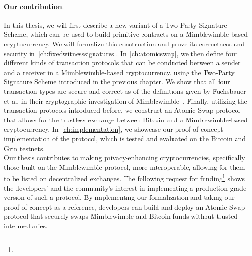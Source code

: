 \paragraph{Our contribution.} In this thesis, we will first describe a new variant of a Two-Party Signature Scheme, which can be used to build primitive contracts on a Mimblewimble-based cryptocurrency.
We will formalize this construction and prove its correctness and security in~\cref{ch:fixedwitnesssignatures}.
In~\cref{ch:atomicswap}, we then define four different kinds of transaction protocols that can be conducted between a sender and a receiver in a Mimblewimble-based cryptocurrency, using the Two-Party Signature Scheme introduced in the previous chapter.
We show that all four transaction types are secure and correct as of the definitions given by Fuchsbauer et al. in their cryptographic investigation of Mimblewimble~\cite{fuchsbauer2019aggregate}.
Finally, utilizing the transaction protocols introduced before, we construct an Atomic Swap protocol that allows for the trustless exchange between Bitcoin and a Mimblewimble-based cryptocurrency.
In~\cref{ch:implementation}, we showcase our proof of concept implementation of the protocol, which is tested and evaluated on the Bitcoin and Grin testnets.\\
Our thesis contributes to making privacy-enhancing cryptocurrencies, specifically those built on the Mimblewimble protocol, more interoperable, allowing for them to be listed on decentralized exchanges.
The following request for funding\footnote{\urlgrinfund} shows the developers' and the community's interest in implementing a production-grade version of such a protocol.
By implementing our formalization and taking our proof of concept as a reference, developers can build and deploy an Atomic Swap protocol that securely swaps Mimblewimble and Bitcoin funds without trusted intermediaries.